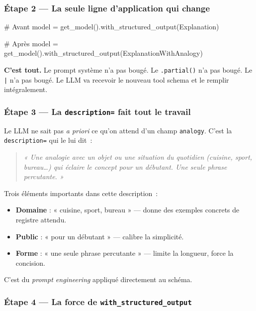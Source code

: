 \documentclass[11pt,a4paper]{article}
\begin{document}
\subsubsection*{Étape 2 — La seule ligne d'application qui change}

\begin{pythoncode}
# Avant
model = get_model().with_structured_output(Explanation)

# Après
model = get_model().with_structured_output(ExplanationWithAnalogy)
\end{pythoncode}

\textbf{C'est tout.} Le prompt système n'a pas bougé. Le \texttt{.partial()}
n'a pas bougé. Le \texttt{|} n'a pas bougé. Le LLM va recevoir le nouveau
tool schema et le remplir intégralement.

\subsubsection*{Étape 3 — La \texttt{description=} fait tout le travail}

Le LLM ne sait pas \emph{a priori} ce qu'on attend d'un champ
\texttt{analogy}. C'est la \texttt{description=} qui le lui dit~:

\begin{quote}\itshape
\textit{« Une analogie avec un objet ou une situation du quotidien
(cuisine, sport, bureau\dots) qui éclaire le concept pour un débutant.
Une seule phrase percutante. »}
\end{quote}

Trois éléments importants dans cette description~:
\begin{itemize}[leftmargin=*]
  \item \textbf{Domaine} : « cuisine, sport, bureau » — donne des exemples
        concrets de registre attendu.
  \item \textbf{Public} : « pour un débutant » — calibre la simplicité.
  \item \textbf{Forme} : « une seule phrase percutante » — limite la
        longueur, force la concision.
\end{itemize}

C'est du \emph{prompt engineering} appliqué directement au schéma.

\subsubsection*{Étape 4 — La force de \texttt{with\_structured\_output}}
\end{document}
